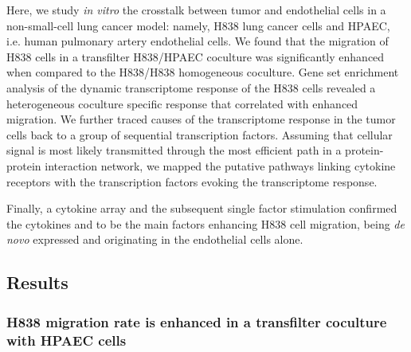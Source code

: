 Here, we 
study \emph{in vitro} the crosstalk between tumor and 
endothelial cells in  a non-small-cell lung cancer model: namely,
H838 lung cancer cells and HPAEC, i.e. human pulmonary artery endothelial cells.
We found that the  migration of  H838 cells in a transfilter H838/HPAEC coculture
was significantly enhanced when compared to the H838/H838
homogeneous coculture.
Gene set enrichment analysis of the dynamic transcriptome
response of the H838 cells  revealed a heterogeneous 
coculture specific response 
that correlated with enhanced migration.
We further 
traced causes of the transcriptome response in the tumor cells back to 
a group of sequential transcription factors.
Assuming that cellular signal is most likely transmitted through the most efficient 
path in a protein-protein interaction network, we 
mapped the putative pathways linking cytokine receptors with the 
transcription factors evoking the transcriptome response. 

Finally, a cytokine array and the subsequent single factor 
stimulation
confirmed the cytokines \tnfa and \sdfonea
to be the main factors enhancing H838 cell migration,
being \emph{de novo} expressed and originating in the endothelial cells alone. 




\subsection{Results}

\subsubsection{H838 migration rate is enhanced in a transfilter coculture with HPAEC cells}

